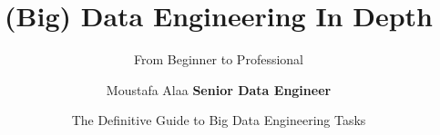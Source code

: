 \title[Data Engineering In Depth] %
{(Big) Data Engineering In Depth}

\subtitle{From Beginner to Professional}


\author[Moustafa Alaa] {
	Moustafa Alaa \newline 	\newline
	\footnotesize \textcolor{offpurple}{\textbf{Senior Data Engineer}} \newline
}


\date[\today] %
{The Definitive Guide to Big Data Engineering Tasks}



